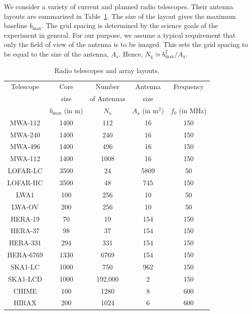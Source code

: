 \documentclass[a4paper,fleqn,usenatbib]{mnras}
\newcommand{\Nant}{N_\textrm{a}}
\newcommand{\Ngrid}{N_\textrm{g}}
\begin{document}
We consider a variety of current and planned radio telescopes. Their antenna 
layouts are summarized in Table~\ref{tab:antenna-layouts}. The size of the 
layout gives the maximum baseline $b_\textrm{max}$. The grid spacing is 
determined by the science goals of the experiment in general. For our 
purpose, we assume a typical requirement that only the field of view of the 
antenna is to be imaged. This sets the grid spacing to be equal to the size 
of the antenna, $A_\textrm{a}$. Hence, 
$\Ngrid\simeq b_\textrm{max}^2/A_\textrm{a}$. 

\begin{table}
  \scriptsize
  \centering
  \caption{Radio telescopes and array layouts.}
  \label{tab:antenna-layouts}
  \begin{threeparttable}
  \begin{tabular}{ccccc} 
    \hline
    Telescope & Core & Number & Antenna & Frequency \\
              & size & of Antennas & size & \\
              & $b_\textrm{max}$ (in m) & $\Nant$ & $A_\textrm{a}$ (in m$^2$) & $f_0$ (in MHz) \\
    \hline
    MWA-112\tnote{a} & 1400 & 112 & 16 & 150 \\
    MWA-240\tnote{a} & 1400 & 240 & 16 & 150 \\
    MWA-496\tnote{a} & 1400 & 496 & 16 & 150 \\
    MWA-112\tnote{a} & 1400 & 1008 & 16 & 150 \\
    LOFAR-LC\tnote{b} & 3500 & 24 & 5809 & 50 \\
    LOFAR-HC\tnote{b} & 3500 & 48 & 745 & 150 \\
    LWA1 & 100 & 256 & 10 & 50 \\
    LWA-OV\tnote{c} & 200 & 256 & 10 & 50 \\
    HERA-19 & 70 & 19 & 154 & 150 \\
    HERA-37 & 98 & 37 & 154 & 150 \\
    HERA-331 & 294 & 331 & 154 & 150 \\
    HERA-6769\tnote{d} & 1330 & 6769 & 154 & 150 \\
    SKA1-LC\tnote{e} & 1000 & 750 & 962 & 150 \\
    SKA1-LCD\tnote{f} & 1000 & 192,000 & 2 & 150 \\
    CHIME & 100 & 1280 & 8 & 600 \\
    HIRAX\tnote{g} & 200 & 1024 & 6 & 600 \\
    \hline
  \end{tabular}

\end{threeparttable}
\end{table}
\end{document}
